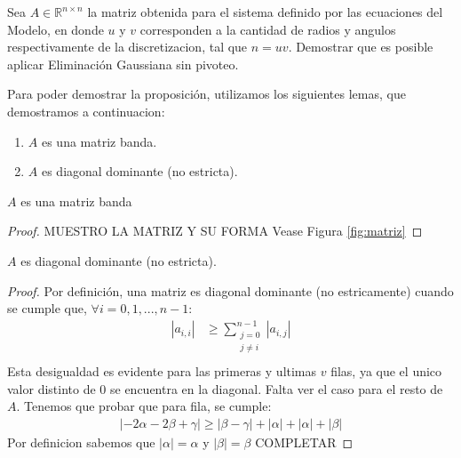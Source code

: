 \begin{proposition}
    Sea $A \in \mathbb{R}^{n \times n}$ la matriz obtenida para el sistema definido por las ecuaciones del Modelo, en donde $u$ y $v$ corresponden a la cantidad de radios y angulos respectivamente de la discretizacion, tal que $n = uv$. Demostrar que es posible aplicar Eliminación Gaussiana sin pivoteo.
\end{proposition}
Para poder demostrar la proposición, utilizamos los siguientes lemas, que demostramos a continuacion:

  \begin{enumerate}[label=(\subscript{L}{\arabic*})]
    \item $A$ es una matriz banda.
    \item $A$ es diagonal dominante (no estricta).
  \end{enumerate}


  \begin{lemma}
    $A$ es una matriz banda
  \end{lemma}

  \begin{proof}
    MUESTRO LA MATRIZ Y SU FORMA
    Vease Figura \ref{fig:matriz}
  \end{proof}

  \begin{lemma}
    $A$ es diagonal dominante (no estricta).
  \end{lemma}

  \begin{proof}
    Por definición, una matriz es diagonal dominante (no estricamente) cuando se cumple que, $\forall i = 0,1,...,n-1$:
    \begin{equation*}
        \begin{aligned}
          |a_{i,i}| &\geq \sum\limits_{\substack{j=0  \\ j \neq i}}^{n-1} |a_{i,j}| \\
        \end{aligned}
    \end{equation*}
    Esta desigualdad es evidente para las primeras  y ultimas $v$ filas, ya que el unico valor distinto de 0 se encuentra en la diagonal.
    Falta ver el caso para el resto de $A$. Tenemos que probar que para fila, se cumple:
    \begin{equation*}
        \begin{aligned}
          |-2\alpha-2\beta+\gamma| \geq |\beta - \gamma| + |\alpha| + |\alpha| + |\beta|
        \end{aligned}
    \end{equation*}
    Por definicion sabemos que $|\alpha| = \alpha$ y $|\beta| = \beta$
    \newline
    COMPLETAR
  \end{proof}

